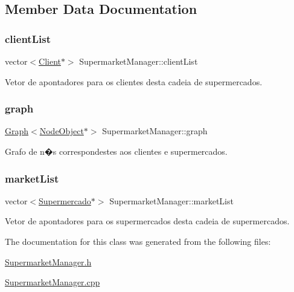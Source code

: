 \subsection{Member Data Documentation}
\mbox{\label{class_supermarket_manager_a48c5227a7d0ca5f8db9de726184e116a}} 
\subsubsection{\texorpdfstring{client\+List}{clientList}}
{\footnotesize\ttfamily vector$<$\hyperlink{class_client}{Client}$\ast$$>$ Supermarket\+Manager\+::client\+List\hspace{0.3cm}{\ttfamily [private]}}

Vetor de apontadores para os clientes desta cadeia de supermercados. \mbox{\label{class_supermarket_manager_ab2cc638ffffc81beda833ca864e8bd62}} 
\subsubsection{\texorpdfstring{graph}{graph}}
{\footnotesize\ttfamily \hyperlink{class_graph}{Graph}$<$\hyperlink{class_node_object}{Node\+Object}$\ast$$>$ Supermarket\+Manager\+::graph\hspace{0.3cm}{\ttfamily [private]}}

Grafo de n�s correspondestes aos clientes e supermercados. \mbox{\label{class_supermarket_manager_a122812406afbf7d0d130d39e6921d5f5}} 
\subsubsection{\texorpdfstring{market\+List}{marketList}}
{\footnotesize\ttfamily vector$<$\hyperlink{class_supermercado}{Supermercado}$\ast$$>$ Supermarket\+Manager\+::market\+List\hspace{0.3cm}{\ttfamily [private]}}

Vetor de apontadores para os supermercados desta cadeia de supermercados. 

The documentation for this class was generated from the following files\+:\begin{DoxyCompactItemize}
\item 
\hyperlink{_supermarket_manager_8h}{Supermarket\+Manager.\+h}\item 
\hyperlink{_supermarket_manager_8cpp}{Supermarket\+Manager.\+cpp}\end{DoxyCompactItemize}
